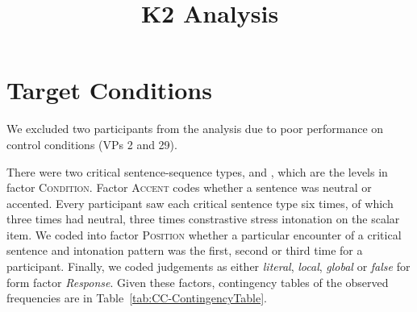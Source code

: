 \documentclass[fleqn,reqno,10pt]{article}
\title{K2 Analysis}
\author{}
\date{}
\newcommand{\as}{\acro{as}}
\renewcommand{\es}{\acro{es}}
\begin{document}
\maketitle


\section{Target Conditions}
\label{sec:target-conditions}

We excluded two participants from the analysis due to poor performance
on control conditions (VPs 2 and 29).

There were two critical sentence-sequence types, \as and \es, which
are the levels in factor \textsc{Condition}. Factor \textsc{Accent}
codes whether a sentence was neutral or accented. Every participant
saw each critical sentence type six times, of which three times had
neutral, three times constrastive stress intonation on the scalar
item. We coded into factor \textsc{Position} whether a particular
encounter of a critical sentence and intonation pattern was the first,
second or third time for a participant. Finally, we coded judgements
as either \emph{literal}, \emph{local}, \emph{global} or \emph{false}
for form factor \emph{Response}. Given these factors, contingency
tables of the observed frequencies are in
Table~\ref{tab:CC-ContingencyTable}.
%
\end{document}
